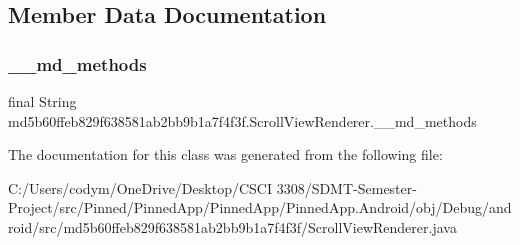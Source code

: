 \subsection{Member Data Documentation}
\mbox{\label{classmd5b60ffeb829f638581ab2bb9b1a7f4f3f_1_1_scroll_view_renderer_ab2b998afe39872cdd0f9f5caea97ed1c}} 
\subsubsection{\texorpdfstring{\+\_\+\+\_\+md\+\_\+methods}{\_\_md\_methods}}
{\footnotesize\ttfamily final String md5b60ffeb829f638581ab2bb9b1a7f4f3f.\+Scroll\+View\+Renderer.\+\_\+\+\_\+md\+\_\+methods\hspace{0.3cm}{\ttfamily [static]}}



The documentation for this class was generated from the following file\+:\begin{DoxyCompactItemize}
\item 
C\+:/\+Users/codym/\+One\+Drive/\+Desktop/\+C\+S\+C\+I 3308/\+S\+D\+M\+T-\/\+Semester-\/\+Project/src/\+Pinned/\+Pinned\+App/\+Pinned\+App/\+Pinned\+App.\+Android/obj/\+Debug/android/src/md5b60ffeb829f638581ab2bb9b1a7f4f3f/Scroll\+View\+Renderer.\+java\end{DoxyCompactItemize}
